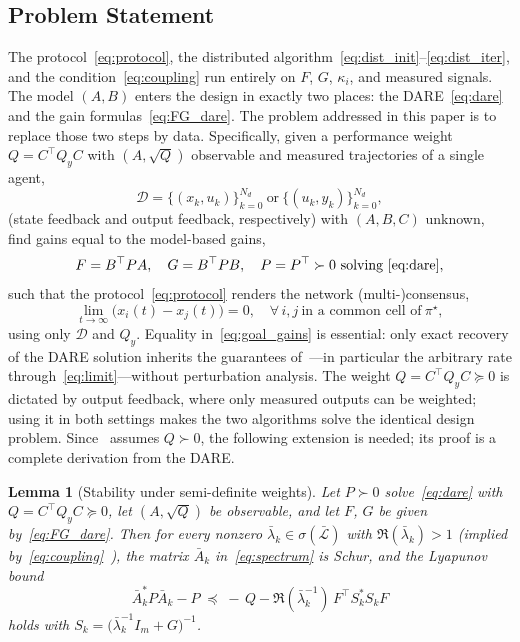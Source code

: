 \documentclass[final,5p,times]{elsarticle}
\theoremstyle{plain}
\newtheorem{lemma}{Lemma}
\theoremstyle{definition}
\theoremstyle{remark}
\begin{document}
\subsection{Problem Statement}
\label{subsec:problem}
The protocol~\eqref{eq:protocol}, the distributed algorithm~\eqref{eq:dist_init}--\eqref{eq:dist_iter}, and the condition~\eqref{eq:coupling} run entirely on $F$, $G$, $\kappa_i$, and measured signals. The model $(A,B)$ enters the design in exactly two places: the DARE~\eqref{eq:dare} and the gain formulas~\eqref{eq:FG_dare}. The problem addressed in this paper is to replace those two steps by data. Specifically, given a performance weight $Q = C^\top Q_y C$ with $(A,\sqrt{Q})$ observable and measured trajectories of a single agent,
\begin{equation}
\mathcal{D} = \big\{(x_k, u_k)\big\}_{k=0}^{N_d}\ \text{or}\ \big\{(u_k, y_k)\big\}_{k=0}^{N_d},
\label{eq:data}
\end{equation}
(state feedback and output feedback, respectively) with $(A,B,C)$ unknown, find gains equal to the model-based gains,
\begin{equation}
F = B^\top P A, \quad G = B^\top P B, \quad P = P^\top \succ 0 \ \text{solving}\ \eqref{eq:dare},
\label{eq:goal_gains}
\end{equation}
such that the protocol~\eqref{eq:protocol} renders the network (multi-)consensus,
\begin{equation}
\lim_{t\to\infty}\big(x_i(t) - x_j(t)\big) = 0, \quad \forall\, i,j\ \text{in a common cell of}\ \pi^\star,
\label{eq:consensus_goal}
\end{equation}
using only $\mathcal{D}$ and $Q_y$. Equality in~\eqref{eq:goal_gains} is essential: only exact recovery of the DARE solution inherits the guarantees of~\cite{cacace2024}---in particular the arbitrary rate through~\eqref{eq:limit}---without perturbation analysis. The weight $Q = C^\top Q_y C \succeq 0$ is dictated by output feedback, where only measured outputs can be weighted; using it in both settings makes the two algorithms solve the identical design problem. Since~\cite[Thm.~3.1]{cacace2024} assumes $Q \succ 0$, the following extension is needed; its proof is a complete derivation from the DARE.
\begin{lemma}[Stability under semi-definite weights]
\label{lem:psdQ}
Let $P \succ 0$ solve~\eqref{eq:dare} with $Q = C^\top Q_y C \succeq 0$, let $(A,\sqrt{Q})$ be observable, and let $F$, $G$ be given by~\eqref{eq:FG_dare}. Then for every nonzero $\bar{\lambda}_k \in \sigma(\bar{\mathcal{L}})$ with $\Re(\bar{\lambda}_k) > 1$ (implied by~\eqref{eq:coupling}~\cite{cacace2024}), the matrix $\bar{A}_k$ in~\eqref{eq:spectrum} is Schur, and the Lyapunov bound
\begin{equation}
\bar{A}_k^* P \bar{A}_k - P \;\preceq\; -\,Q - \Re(\bar\lambda_k^{-1})\, F^\top S_k^* S_k F
\label{eq:psdQ_bound}
\end{equation}
holds with $S_k = \big(\bar\lambda_k^{-1}I_m + G\big)^{-1}$.
\end{lemma}
\end{document}

